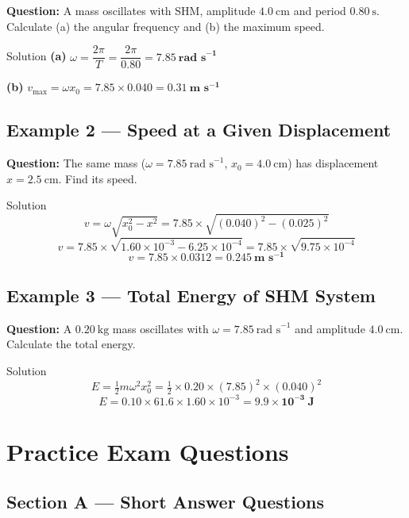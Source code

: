 \textbf{Question:} A mass oscillates with SHM, amplitude $4.0\ \text{cm}$ and period $0.80\ \text{s}$. Calculate (a) the angular frequency and (b) the maximum speed.

\begin{examplebox}{Solution}
\textbf{(a)} \quad $\omega = \dfrac{2\pi}{T} = \dfrac{2\pi}{0.80} = \mathbf{7.85\ \text{rad s}^{-1}}$

\vspace{0.5em}
\textbf{(b)} \quad $v_{\max} = \omega x_0 = 7.85 \times 0.040 = \mathbf{0.31\ \text{m s}^{-1}}$
\end{examplebox}

\subsection*{Example 2 — Speed at a Given Displacement}

\textbf{Question:} The same mass ($\omega = 7.85\ \text{rad s}^{-1}$, $x_0 = 4.0\ \text{cm}$) has displacement $x = 2.5\ \text{cm}$. Find its speed.

\begin{examplebox}{Solution}
$$v = \omega\sqrt{x_0^2 - x^2} = 7.85\times\sqrt{(0.040)^2 - (0.025)^2}$$
$$v = 7.85\times\sqrt{1.60\times10^{-3} - 6.25\times10^{-4}} = 7.85\times\sqrt{9.75\times10^{-4}}$$
$$v = 7.85\times 0.0312 = \mathbf{0.245\ \text{m s}^{-1}}$$
\end{examplebox}

\subsection*{Example 3 — Total Energy of SHM System}

\textbf{Question:} A $0.20\ \text{kg}$ mass oscillates with $\omega = 7.85\ \text{rad s}^{-1}$ and amplitude $4.0\ \text{cm}$. Calculate the total energy.

\begin{examplebox}{Solution}
$$E = \tfrac{1}{2}m\omega^2 x_0^2 = \tfrac{1}{2}\times 0.20 \times (7.85)^2 \times (0.040)^2$$
$$E = 0.10\times 61.6\times 1.60\times10^{-3} = \mathbf{9.9\times10^{-3}\ \text{J}}$$
\end{examplebox}

\section{Practice Exam Questions}

\subsection*{Section A — Short Answer Questions}


